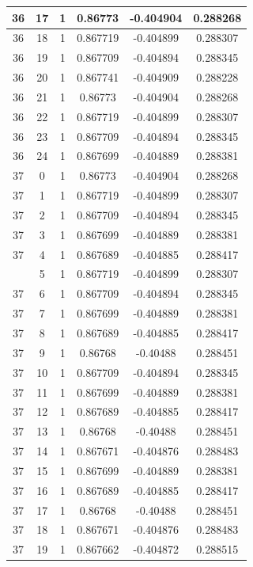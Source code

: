 \documentclass[12pt,a4paper]{article}
\numberwithin{equation}{section}
\numberwithin{figure}{section}
\numberwithin{table}{section}
\begin{document}
\begin{longtable}{|c|c|c|c|c|c|}
36 & 17 & 1 & 0.86773 & -0.404904 & 0.288268 \\ \hline
36 & 18 & 1 & 0.867719 & -0.404899 & 0.288307 \\ \hline
36 & 19 & 1 & 0.867709 & -0.404894 & 0.288345 \\ \hline
36 & 20 & 1 & 0.867741 & -0.404909 & 0.288228 \\ \hline
36 & 21 & 1 & 0.86773 & -0.404904 & 0.288268 \\ \hline
36 & 22 & 1 & 0.867719 & -0.404899 & 0.288307 \\ \hline
36 & 23 & 1 & 0.867709 & -0.404894 & 0.288345 \\ \hline
36 & 24 & 1 & 0.867699 & -0.404889 & 0.288381 \\ \hline
37 & 0 & 1 & 0.86773 & -0.404904 & 0.288268 \\ \hline
37 & 1 & 1 & 0.867719 & -0.404899 & 0.288307 \\ \hline
37 & 2 & 1 & 0.867709 & -0.404894 & 0.288345 \\ \hline
37 & 3 & 1 & 0.867699 & -0.404889 & 0.288381 \\ \hline
37 & 4 & 1 & 0.867689 & -0.404885 & 0.288417 \\ \hline
\pagebreak
37 & 5 & 1 & 0.867719 & -0.404899 & 0.288307 \\ \hline
37 & 6 & 1 & 0.867709 & -0.404894 & 0.288345 \\ \hline
37 & 7 & 1 & 0.867699 & -0.404889 & 0.288381 \\ \hline
37 & 8 & 1 & 0.867689 & -0.404885 & 0.288417 \\ \hline
37 & 9 & 1 & 0.86768 & -0.40488 & 0.288451 \\ \hline
37 & 10 & 1 & 0.867709 & -0.404894 & 0.288345 \\ \hline
37 & 11 & 1 & 0.867699 & -0.404889 & 0.288381 \\ \hline
37 & 12 & 1 & 0.867689 & -0.404885 & 0.288417 \\ \hline
37 & 13 & 1 & 0.86768 & -0.40488 & 0.288451 \\ \hline
37 & 14 & 1 & 0.867671 & -0.404876 & 0.288483 \\ \hline
37 & 15 & 1 & 0.867699 & -0.404889 & 0.288381 \\ \hline
37 & 16 & 1 & 0.867689 & -0.404885 & 0.288417 \\ \hline
37 & 17 & 1 & 0.86768 & -0.40488 & 0.288451 \\ \hline
37 & 18 & 1 & 0.867671 & -0.404876 & 0.288483 \\ \hline
37 & 19 & 1 & 0.867662 & -0.404872 & 0.288515 \\ \hline

\end{longtable}
\end{document}

